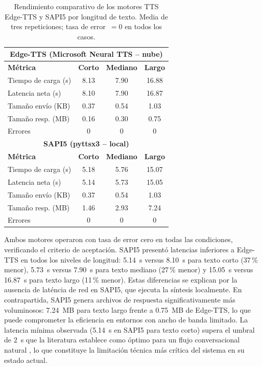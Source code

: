 \documentclass[journal]{IEEEtran}
\begin{document}
	\begin{table}[!t]
		\caption{Rendimiento comparativo de los motores TTS Edge-TTS y SAPI5 por longitud de texto. Media de tres repeticiones; tasa de error~$= 0$ en todos los casos.}
		\label{tab:tts}
		\centering
		\renewcommand{\arraystretch}{1.25}
		\begin{tabular}{lccc}
			\toprule
			\multicolumn{4}{c}{\textbf{Edge-TTS (Microsoft Neural TTS -- nube)}} \\
			\midrule
			\textbf{M\'etrica} & \textbf{Corto} & \textbf{Mediano} & \textbf{Largo} \\
			\midrule
			Tiempo de carga (s)   & 8.13  & 7.90  & 16.88 \\
			Latencia neta (s)     & 8.10  & 7.90  & 16.87 \\
			Tama\~no env\'io (KB) & 0.37  & 0.54  & 1.03  \\
			Tama\~no resp. (MB)   & 0.16  & 0.30  & 0.75  \\
			Errores               & 0     & 0     & 0     \\
			\midrule
			\multicolumn{4}{c}{\textbf{SAPI5 (pyttsx3 -- local)}} \\
			\midrule
			\textbf{M\'etrica} & \textbf{Corto} & \textbf{Mediano} & \textbf{Largo} \\
			\midrule
			Tiempo de carga (s)   & 5.18  & 5.76  & 15.07 \\
			Latencia neta (s)     & 5.14  & 5.73  & 15.05 \\
			Tama\~no env\'io (KB) & 0.37  & 0.54  & 1.03  \\
			Tama\~no resp. (MB)   & 1.46  & 2.93  & 7.24  \\
			Errores               & 0     & 0     & 0     \\
			\bottomrule
		\end{tabular}
	\end{table}
	
	Ambos motores operaron con tasa de error cero en todas las condiciones, verificando el criterio de aceptaci\'on. SAPI5 present\'o latencias inferiores a Edge-TTS en todos los niveles de longitud: 5.14~s versus 8.10~s para texto corto (37\,\% menor), 5.73~s versus 7.90~s para texto mediano (27\,\% menor) y 15.05~s versus 16.87~s para texto largo (11\,\% menor). Estas diferencias se explican por la ausencia de lat\'encia de red en SAPI5, que ejecuta la s\'intesis localmente. En contrapartida, SAPI5 genera archivos de respuesta significativamente m\'as voluminosos: 7.24~MB para texto largo frente a 0.75~MB de Edge-TTS, lo que puede comprometer la eficiencia en entornos con ancho de banda limitado. La latencia m\'inima observada (5.14~s en SAPI5 para texto corto) supera el umbral de 2~s que la literatura establece como \'optimo para un flujo conversacional natural \cite{tan2021}, lo que constituye la limitaci\'on t\'ecnica m\'as cr\'itica del sistema en su estado actual.
	
\end{document}
